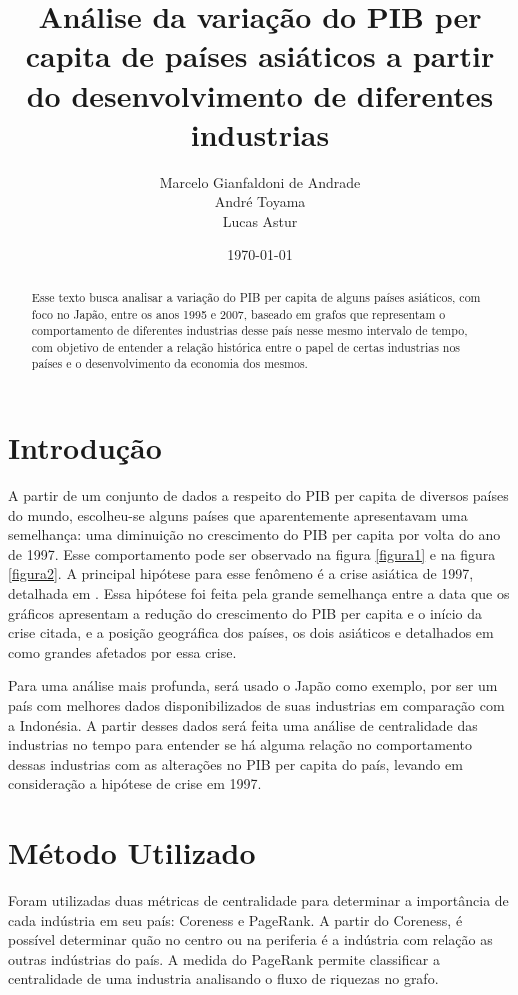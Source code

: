 \documentclass[12pt]{article}
\title{Análise da variação do PIB per capita de países asiáticos a partir do desenvolvimento de diferentes industrias}
\author{
	Marcelo Gianfaldoni de Andrade\\
	André Toyama \\
	Lucas Astur \\
}
\date{\today}
\begin{document}
\maketitle

\newpage
\tableofcontents
\newpage

\begin{abstract}
Esse texto busca analisar a variação do PIB per capita de alguns países asiáticos, com foco no Japão, entre os anos 1995 e 2007, baseado em grafos que representam o comportamento de diferentes industrias desse país nesse mesmo intervalo de tempo, com objetivo de entender a relação histórica entre o papel de certas industrias nos países e o desenvolvimento da economia dos mesmos.
\end{abstract}

\section{Introdução}

A partir de um conjunto de dados a respeito do PIB per capita de diversos países do mundo, escolheu-se alguns países que aparentemente apresentavam uma semelhança: uma diminuição no crescimento do PIB per capita por volta do ano de 1997. Esse comportamento pode ser observado na figura \ref{figura1} e na figura \ref{figura2}. A principal hipótese para esse fenômeno é a crise asiática de 1997, detalhada em \cite{crise_asiatica}. Essa hipótese foi feita pela grande semelhança entre a data que os gráficos apresentam a redução do crescimento do PIB per capita e o início da crise citada, e a posição geográfica dos países, os dois asiáticos e detalhados em \cite{crise_asiatica} como grandes afetados por essa crise.

Para uma análise mais profunda, será usado o Japão como exemplo, por ser um país com melhores dados disponibilizados de suas industrias em comparação com a Indonésia. A partir desses dados será feita uma análise de centralidade das industrias no tempo para entender se há alguma relação no comportamento dessas industrias com as alterações no PIB per capita do país, levando em consideração a hipótese de crise em 1997.

\section{Método Utilizado}

Foram utilizadas duas métricas de centralidade para determinar a
importância de cada indústria em seu país: Coreness e PageRank. A partir do
Coreness, é possível determinar quão no centro ou na periferia é a indústria
com relação as outras indústrias do país. A medida do PageRank permite
classificar a centralidade de uma industria analisando o fluxo de riquezas no grafo.
\end{document}

